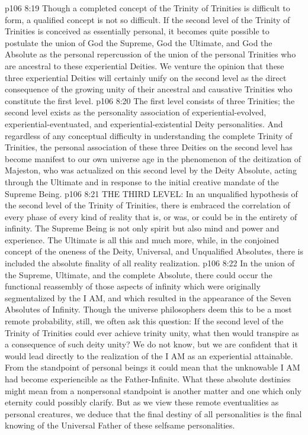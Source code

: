 \vs p106 8:19 Though a completed concept of the Trinity of Trinities is difficult to form, a qualified concept is not so difficult. If the second level of the Trinity of Trinities is conceived as essentially personal, it becomes quite possible to postulate the union of God the Supreme, God the Ultimate, and God the Absolute as the personal repercussion of the union of the personal Trinities who are ancestral to these experiential Deities. We venture the opinion that these three experiential Deities will certainly unify on the second level as the direct consequence of the growing unity of their ancestral and causative Trinities who constitute the first level.
\vs p106 8:20 The first level consists of three Trinities; the second level exists as the personality association of experiential\hyp{}evolved, experiential\hyp{}eventuated, and experiential\hyp{}existential Deity personalities. And regardless of any conceptual difficulty in understanding the complete Trinity of Trinities, the personal association of these three Deities on the second level has become manifest to our own universe age in the phenomenon of the deitization of Majeston, who was actualized on this second level by the Deity Absolute, acting through the Ultimate and in response to the initial creative mandate of the Supreme Being.
\vs p106 8:21 THE THIRD LEVEL: In an unqualified hypothesis of the second level of the Trinity of Trinities, there is embraced the correlation of every phase of every kind of reality that is, or was, or could be in the entirety of infinity. The Supreme Being is not only spirit but also mind and power and experience. The Ultimate is all this and much more, while, in the conjoined concept of the oneness of the Deity, Universal, and Unqualified Absolutes, there is included the absolute finality of all reality realization.
\vs p106 8:22 In the union of the Supreme, Ultimate, and the complete Absolute, there could occur the functional reassembly of those aspects of infinity which were originally segmentalized by the I AM, and which resulted in the appearance of the Seven Absolutes of Infinity. Though the universe philosophers deem this to be a most remote probability, still, we often ask this question: If the second level of the Trinity of Trinities could ever achieve trinity unity, what then would transpire as a consequence of such deity unity? We do not know, but we are confident that it would lead directly to the realization of the I AM as an experiential attainable. From the standpoint of personal beings it could mean that the unknowable I AM had become experiencible as the Father\hyp{}Infinite. What these absolute destinies might mean from a nonpersonal standpoint is another matter and one which only eternity could possibly clarify. But as we view these remote eventualities as personal creatures, we deduce that the final destiny of all personalities is the final knowing of the Universal Father of these selfsame personalities.\plusone
